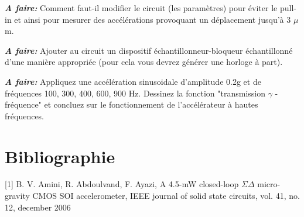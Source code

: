 \documentclass[12pt,A4,onecolumn,french]{article}
\begin{document}
\emph{\bf A faire:} Comment faut-il modifier le circuit (les paramètres) pour éviter le pull-in et ainsi pour mesurer des accélérations provoquant un déplacement jusqu'à 3 $\mu$m. 

\emph{\bf A faire:} Ajouter au circuit un dispositif échantillonneur-bloqueur
échantillonné d'une manière appropriée (pour cela vous devrez générer une horloge à part).

\emph{\bf A faire:} Appliquez une accélération sinusoidale d'amplitude 0.2g et de fréquences 100, 300, 400, 600, 900 Hz. Dessinez la fonction "transmission $\gamma$ - fréquence" et concluez sur le fonctionnement de l'accélérateur à hautes fréquences.  

\section{Bibliographie}
[1] B. V. Amini, R. Abdoulvand, F. Ayazi, A 4.5-mW closed-loop $\Sigma\Delta$ micro-gravity CMOS SOI accelerometer, IEEE journal of solid state circuits, vol. 41, no. 12, december 2006
\end{document}
